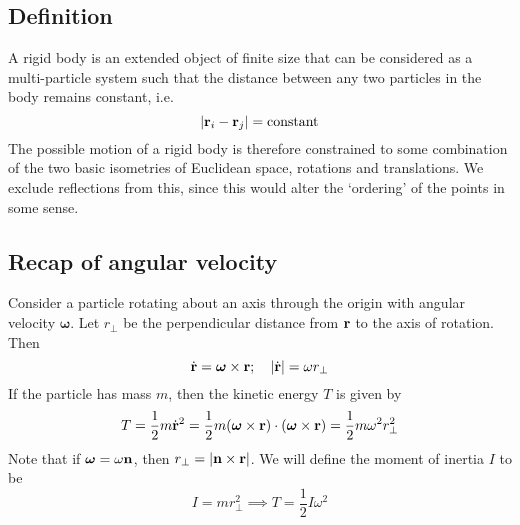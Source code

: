 \subsection{Definition}
A rigid body is an extended object of finite size that can be considered as a multi-particle system such that the distance between any two particles in the body remains constant, i.e.
\[
	\abs{\vb r_i - \vb r_j} = \text{constant}
\]
The possible motion of a rigid body is therefore constrained to some combination of the two basic isometries of Euclidean space, rotations and translations.
We exclude reflections from this, since this would alter the `ordering' of the points in some sense.

\subsection{Recap of angular velocity}
Consider a particle rotating about an axis through the origin with angular velocity \(\bm \omega\).
Let \(r_\perp\) be the perpendicular distance from \(\vb r\) to the axis of rotation.
Then
\[
	\dot{\vb{r}} = \bm\omega \times \vb r;\quad \abs{\dot{\vb{r}}} = \omega r_\perp
\]
If the particle has mass \(m\), then the kinetic energy \(T\) is given by
\[
	T = \frac{1}{2}m\dot{\vb{r}}^2 = \frac{1}{2}m (\bm\omega \times \vb r) \cdot (\bm\omega \times \vb r) = \frac{1}{2}m\omega^2 r_\perp^2
\]
Note that if \(\bm\omega = \omega \vb n\), then \(r_\perp = \abs{\vb n \times \vb r}\).
We will define the moment of inertia \(I\) to be
\[
	I = mr_\perp^2 \implies T = \frac{1}{2}I\omega^2
\]


